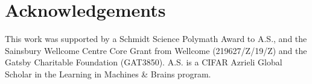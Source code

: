 \section*{Acknowledgements}
This work was supported by a Schmidt Science Polymath Award to A.S., and the Sainsbury Wellcome Centre Core Grant from Wellcome (219627/Z/19/Z) and the Gatsby Charitable Foundation (GAT3850). A.S. is a CIFAR Azrieli Global Scholar in the Learning in Machines \& Brains program.
